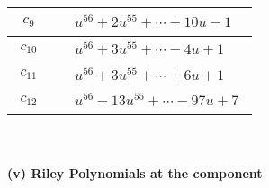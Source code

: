 \documentclass[1p]{elsarticle_modified}
\theoremstyle{definition}
\begin{document}
\begin{tabular}{m{50pt}|m{274pt}}
\hline $$\begin{aligned}c_{9}\end{aligned}$$&$\begin{aligned}
&u^{56}+2 u^{55}+\cdots+10 u-1
\end{aligned}$\\
\hline $$\begin{aligned}c_{10}\end{aligned}$$&$\begin{aligned}
&u^{56}+3 u^{55}+\cdots-4 u+1
\end{aligned}$\\
\hline $$\begin{aligned}c_{11}\end{aligned}$$&$\begin{aligned}
&u^{56}+3 u^{55}+\cdots+6 u+1
\end{aligned}$\\
\hline $$\begin{aligned}c_{12}\end{aligned}$$&$\begin{aligned}
&u^{56}-13 u^{55}+\cdots-97 u+7
\end{aligned}$\\
\hline
\end{tabular}\\~\\
\newpage\renewcommand{\arraystretch}{1}
\flushleft \textbf{(v) Riley Polynomials at the component}\newline \\
\end{document}
